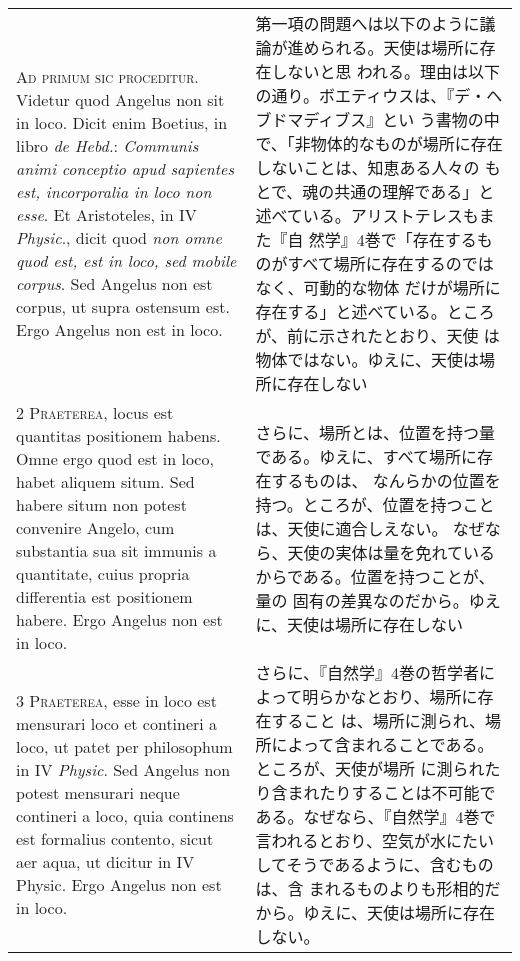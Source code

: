 \documentclass[10pt]{jsarticle} %
\begin{document}
\begin{longtable}{p{21em}p{21em}}

{\huge A}{\scshape d primum sic proceditur}. Videtur quod Angelus non
 sit in loco. Dicit enim Boetius, in libro {\itshape de Hebd.}:
 {\itshape Communis animi conceptio apud sapientes est, incorporalia in
 loco non esse}. Et Aristoteles, in IV {\itshape Physic}., dicit quod
 {\itshape non omne quod est, est in loco, sed mobile corpus}. Sed
 Angelus non est corpus, ut supra ostensum est. Ergo Angelus non est in
 loco.

&

第一項の問題へは以下のように議論が進められる。天使は場所に存在しないと思
 われる。理由は以下の通り。ボエティウスは、『デ・ヘブドマディブス』とい
 う書物の中で、「非物体的なものが場所に存在しないことは、知恵ある人々の
 もとで、魂の共通の理解である」と述べている。アリストテレスもまた『自
 然学』4巻で「存在するものがすべて場所に存在するのではなく、可動的な物体
 だけが場所に存在する」と述べている。ところが、前に示されたとおり、天使
 は物体ではない。ゆえに、天使は場所に存在しない

\\


2 {\scshape Praeterea}, locus est quantitas positionem habens. Omne ergo
 quod est in loco, habet aliquem situm. Sed habere situm non potest
 convenire Angelo, cum substantia sua sit immunis a quantitate, cuius
 propria differentia est positionem habere. Ergo Angelus non est in
 loco.

&

さらに、場所とは、位置を持つ量である。ゆえに、すべて場所に存在するものは、
 なんらかの位置を持つ。ところが、位置を持つことは、天使に適合しえない。
 なぜなら、天使の実体は量を免れているからである。位置を持つことが、量の
 固有の差異なのだから。ゆえに、天使は場所に存在しない

\\


3 {\scshape Praeterea}, esse in loco est mensurari loco et contineri a
 loco, ut patet per philosophum in IV {\itshape Physic}. Sed Angelus non potest
 mensurari neque contineri a loco, quia continens est formalius
 contento, sicut aer aqua, ut dicitur in IV Physic. Ergo Angelus non est
 in loco.

&

さらに、『自然学』4巻の哲学者によって明らかなとおり、場所に存在すること
 は、場所に測られ、場所によって含まれることである。ところが、天使が場所
 に測られたり含まれたりすることは不可能である。なぜなら、『自然学』4巻で
 言われるとおり、空気が水にたいしてそうであるように、含むものは、含
 まれるものよりも形相的だから。ゆえに、天使は場所に存在しない。



\end{longtable}
\end{document}
